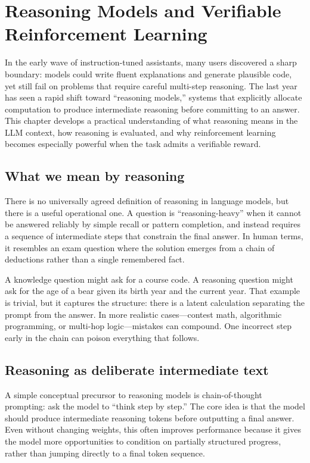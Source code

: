 
\chapter{Reasoning Models and Verifiable Reinforcement Learning}
\label{chap:reasoning-models}

In the early wave of instruction-tuned assistants, many users discovered a sharp boundary: models could write fluent explanations and generate plausible code, yet still fail on problems that require careful multi-step reasoning. The last year has seen a rapid shift toward “reasoning models,” systems that explicitly allocate computation to produce intermediate reasoning before committing to an answer. This chapter develops a practical understanding of what reasoning means in the LLM context, how reasoning is evaluated, and why reinforcement learning becomes especially powerful when the task admits a verifiable reward.

\section{What we mean by reasoning}
There is no universally agreed definition of reasoning in language models, but there is a useful operational one. A question is “reasoning-heavy” when it cannot be answered reliably by simple recall or pattern completion, and instead requires a sequence of intermediate steps that constrain the final answer. In human terms, it resembles an exam question where the solution emerges from a chain of deductions rather than a single remembered fact.

A knowledge question might ask for a course code. A reasoning question might ask for the age of a bear given its birth year and the current year. That example is trivial, but it captures the structure: there is a latent calculation separating the prompt from the answer. In more realistic cases—contest math, algorithmic programming, or multi-hop logic—mistakes can compound. One incorrect step early in the chain can poison everything that follows.

\section{Reasoning as deliberate intermediate text}
A simple conceptual precursor to reasoning models is chain-of-thought prompting: ask the model to “think step by step.” The core idea is that the model should produce intermediate reasoning tokens before outputting a final answer. Even without changing weights, this often improves performance because it gives the model more opportunities to condition on partially structured progress, rather than jumping directly to a final token sequence.

